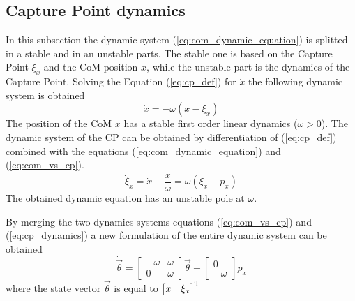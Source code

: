 \subsection{Capture Point dynamics}
In this subsection the dynamic system (\ref{eq:com_dynamic_equation}) is splitted in a stable and
in an unstable parts. The stable one is based on the Capture Point $\xi_x$ and the CoM position $x$, while the unstable part is the dynamics of the Capture Point.
Solving the Equation
(\ref{eq:cp_def}) for $\dot{x}$ the following dynamic system is obtained
\begin{equation}
  \label{eq:com_vs_cp}
  \dot{x} = - \omega (x - \xi_x)
\end{equation}
The position of the CoM $x$ has a stable first order linear dynamics ($\omega > 0$).
The dynamic system of the CP can be obtained by differentiation of (\ref{eq:cp_def}) combined with
the equations (\ref{eq:com_dynamic_equation}) and (\ref{eq:com_vs_cp}).
\begin{equation}
  \label{eq:cp_dynamics}
  \dot{\xi}_x = \dot{x} + \frac{\ddot{x}}{\omega} = \omega (\xi_x - p_x) 
\end{equation}
The obtained dynamic equation has an unstable pole at $\omega$.
\par
By merging the two dynamics systems equations (\ref{eq:com_vs_cp}) and (\ref{eq:cp_dynamics}) a new
formulation of the entire dynamic system can be obtained
\[
\dot{\vec{\theta}} =
\begin{bmatrix}
  -\omega & \omega \\
  0 & \omega
\end{bmatrix}
\vec{\theta} +
\begin{bmatrix}
  0 \\
  -\omega 
\end{bmatrix}
p_x
\]
where the state vector $\vec{\theta}$ is equal to $ \begin{bmatrix} x & \xi_x \end{bmatrix}^{\mathrm{T}}$
\newpage
